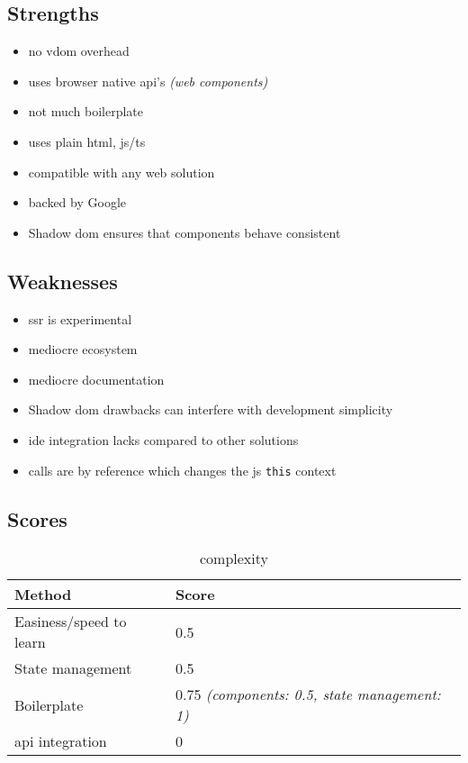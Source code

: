 \subsection{Strengths}
\label{subsec:lit:strengths}
\begin{itemize}
    \item no \acrshort{vdom} overhead
    \item uses browser native \acrshort{api}'s \textit{(web components)}
    \item not much boilerplate
    \item uses plain \acrshort{html}, \acrshort{js}/\acrshort{ts}
    \item compatible with any web solution
    \item backed by Google
    \item Shadow \acrshort{dom} ensures that components behave consistent
\end{itemize}

\subsection{Weaknesses}
\label{subsec:lit:weaknesses}
\begin{itemize}
    \item \acrshort{ssr} is experimental
    \item mediocre ecosystem
    \item mediocre documentation
    \item Shadow \acrshort{dom} drawbacks can interfere with development simplicity
    \item \acrshort{ide} integration lacks compared to other solutions
    \item calls are by reference which changes the \acrshort{js} \texttt{this} context
\end{itemize}


\subsection{Scores}
\label{subsec:lit:scores}

\begin{table}[H]
    \centering
    \begin{tabular}{|l|l|}
        \hline
        \textbf{Method}            & \textbf{Score}                                       \\
        \hline
        Easiness/speed to learn    & 0.5                                                  \\ \hline
        State management           & 0.5                                                  \\ \hline
        Boilerplate                & 0.75 \textit{(components: 0.5, state management: 1)} \\ \hline
        \acrshort{api} integration & 0                                                    \\ \hline
    \end{tabular}
    \caption{complexity}
    \label{tab:lit:complexity}
\end{table}

